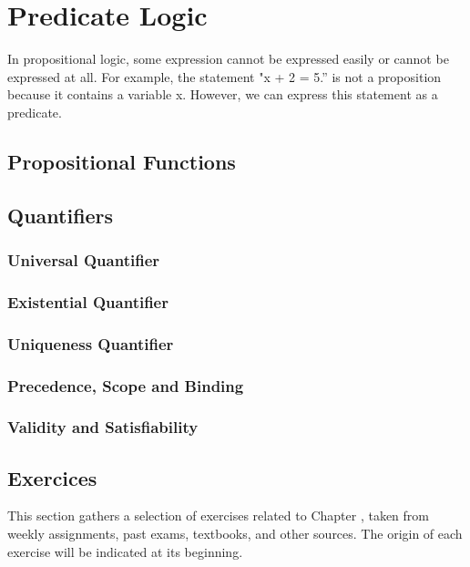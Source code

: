 \chapter{Predicate Logic}
In propositional logic, some expression cannot be expressed easily or cannot be expressed at all. For example, the statement "x + 2 = 5.” is not a proposition because it contains a variable x. However, we can express this statement as a predicate.

\section{Propositional Functions}

\section{Quantifiers}

\subsection{Universal Quantifier}

\subsection{Existential Quantifier}

\subsection{Uniqueness Quantifier}

\subsection{Precedence, Scope and Binding}

\subsection{Validity and Satisfiability}

\section{Exercices}
This section gathers a selection of exercises related to Chapter \thechapter, taken from weekly assignments, past exams, textbooks, and other sources. The origin of each exercise will be indicated at its beginning.

